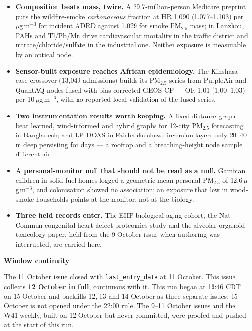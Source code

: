 \documentclass[10pt]{article}
\begin{document}
\footnotesize
\begin{itemize}

\item \textbf{Composition beats mass, twice.} A 39.7-million-person Medicare preprint puts the wildfire-smoke
\textit{carbonaceous} fraction at HR 1.090 (1.077--1.103) per $\mu$g\,m$^{-3}$ for incident ADRD against 1.029
for smoke PM$_{2.5}$ mass; in Lanzhou, PAHs and Tl/Pb/Mn drive cardiovascular mortality in the traffic district
and nitrate/chloride/sulfate in the industrial one. Neither exposure is measurable by an optical node.

\item \textbf{Sensor-built exposure reaches African epidemiology.} The Kinshasa case-crossover (13,049
admissions) builds its PM$_{2.5}$ series from PurpleAir and QuantAQ nodes fused with bias-corrected GEOS-CF ---
OR 1.01 (1.00--1.03) per 10\,$\mu$g\,m$^{-3}$, with no reported local validation of the fused series.

\item \textbf{Two instrumentation results worth keeping.} A fixed distance graph beat learned, wind-informed and
hybrid graphs for 12-city PM$_{2.5}$ forecasting in Bangladesh; and LP-DOAS in Fairbanks shows inversion
layers only 20--40\,m deep persisting for days --- a rooftop and a breathing-height node sample different air.

\item \textbf{A personal-monitor null that should not be read as a null.} Gambian children in solid-fuel homes
logged a geometric-mean personal PM$_{2.5}$ of 12.6\,$\mu$g\,m$^{-3}$, and colonisation showed no association;
an exposure that low in wood-smoke households points at the monitor, not at the biology.

\item \textbf{Three held records enter.} The EHP biological-aging cohort, the Nat Commun congenital-heart-defect
proteomics study and the alveolar-organoid toxicology paper, held from the 9 October issue when authoring was
interrupted, are carried here.

\end{itemize}

\vspace{2mm}

\begin{keybox}
{\sffamily\bfseries\footnotesize\color{Deep}Window continuity}\\[1.2mm]
{\fontsize{7.2}{8.8}\selectfont
The 11 October issue closed with \texttt{last\_entry\_date} at 11 October. This issue collects
\textbf{12 October in full}, continuous with it. This run began at 19:46 CDT on 15 October and backfills
12, 13 and 14 October as three separate issues; 15 October is not opened under the 22:00 rule. The 9--11
October issues and the W41 weekly, built on 12 October but never committed, were proofed and pushed at the
start of this run.\par}
\end{keybox}
\end{document}
